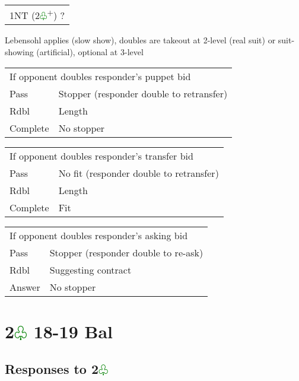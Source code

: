 \documentclass{article}
\newcommand{\cl}{\textcolor{Green}{$\varclub$}}
\newcommand{\nt}{\relsize{-1}NT\relsize{1}}
\newcommand{\up}{\textsuperscript{+}}
\begin{document}
\medskip

\begin{tabular}{|l|p{6.5cm}}
	\multicolumn{2}{l}{1\nt{} (2\cl{}\up{}) ?}\\
\end{tabular}

Lebensohl applies (slow show), doubles are takeout at 2-level (real suit) or suit-showing (artificial), optional at 3-level \\

\begin{tabular}{|l|p{6.5cm}}
	\multicolumn{2}{l}{If opponent doubles responder's puppet bid}\\
	Pass & Stopper (responder double to retransfer) \\
	Rdbl & Length \\
	Complete & No stopper
\end{tabular}

\medskip

\begin{tabular}{|l|p{6.5cm}}
	\multicolumn{2}{l}{If opponent doubles responder's transfer bid}\\
	Pass & No fit (responder double to retransfer) \\
	Rdbl & Length \\
	Complete & Fit
\end{tabular}

\medskip

\begin{tabular}{|l|p{6.5cm}}
	\multicolumn{2}{l}{If opponent doubles responder's asking bid}\\
	Pass & Stopper (responder double to re-ask) \\
	Rdbl & Suggesting contract \\
	Answer & No stopper
\end{tabular}

\section{2\cl{} 18-19 Bal}

\subsection{Responses to 2\cl{}}
\end{document}
